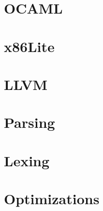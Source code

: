 \section{OCAML}


\section{x86Lite}





\section{LLVM}

\section{Parsing}

\section{Lexing}

\section{Optimizations}
